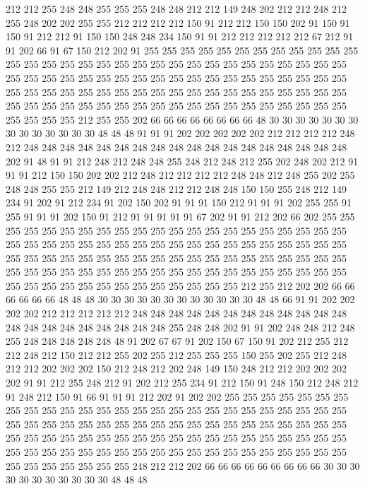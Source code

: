212 212 255 248 248 255 255 255 248 248 212 212 149 248 202 212 212 248 212 255
248 202 202 255 255 212 212 212 212 150 91 212 212 150 150 202 91 150 91 150
91 212 212 91 150 150 248 248 234 150 91 91 212 212 212 212 212 67 212 91
91 202 66 91 67 150 212 202 91 255 255 255 255 255 255 255 255 255 255 255
255 255 255 255 255 255 255 255 255 255 255 255 255 255 255 255 255 255 255 255
255 255 255 255 255 255 255 255 255 255 255 255 255 255 255 255 255 255 255 255
255 255 255 255 255 255 255 255 255 255 255 255 255 255 255 255 255 255 255 255
255 255 255 255 255 255 255 255 255 255 255 255 255 255 255 255 255 255 255 255
255 212 255 255 202 66 66 66 66 66 66 66 66 48 30 30 30 30 30 30
30 30 30 30 30 30 30 30 48 48 48 91 91 91 202 202 202 202 202 212
212 212 212 248 212 248 248 248 248 248 248 248 248 248 248 248 248 248 248 248
248 248 248 202 91 48 91 91 212 248 212 248 248 255 248 212 248 212 255 202
248 202 212 91 91 91 212 150 150 202 202 212 248 212 212 212 212 248 248 212
248 255 202 255 248 248 255 255 212 149 212 248 248 212 212 248 248 150 150 255
248 212 149 234 91 202 91 212 234 91 202 150 202 91 91 91 150 212 91 91
91 202 255 255 91 255 91 91 91 202 150 91 212 91 91 91 91 91 67 202
91 91 212 202 66 202 255 255 255 255 255 255 255 255 255 255 255 255 255 255
255 255 255 255 255 255 255 255 255 255 255 255 255 255 255 255 255 255 255 255
255 255 255 255 255 255 255 255 255 255 255 255 255 255 255 255 255 255 255 255
255 255 255 255 255 255 255 255 255 255 255 255 255 255 255 255 255 255 255 255
255 255 255 255 255 255 255 255 255 255 255 255 255 255 255 255 255 212 255 212
202 202 66 66 66 66 66 66 48 48 48 30 30 30 30 30 30 30 30 30
30 30 30 48 48 66 91 91 202 202 202 202 212 212 212 212 212 248 248 248
248 248 248 248 248 248 248 248 248 248 248 248 248 248 248 248 248 248 255 248
248 202 91 91 202 248 248 212 248 255 248 248 248 248 248 48 91 202 67 67
91 202 150 67 150 91 202 212 255 212 212 248 212 150 212 212 255 202 255 212
255 255 255 150 255 202 255 212 248 212 212 202 202 202 150 212 248 212 202 248
149 150 248 212 212 202 202 202 202 91 91 212 255 248 212 91 202 212 255 234
91 212 150 91 248 150 212 248 212 91 248 212 150 91 66 91 91 91 212 202
91 202 202 255 255 255 255 255 255 255 255 255 255 255 255 255 255 255 255 255
255 255 255 255 255 255 255 255 255 255 255 255 255 255 255 255 255 255 255 255
255 255 255 255 255 255 255 255 255 255 255 255 255 255 255 255 255 255 255 255
255 255 255 255 255 255 255 255 255 255 255 255 255 255 255 255 255 255 255 255
255 255 255 255 255 255 255 255 255 255 255 255 255 248 212 212 202 66 66 66
66 66 66 66 66 66 30 30 30 30 30 30 30 30 30 30 30 48 48 48
